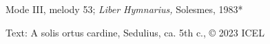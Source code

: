 

\begin{hymnsource}
Mode III, melody 53; \emph{Liber Hymnarius,} Solesmes, 1983*

Text: {A solis ortus cardine,} Sedulius, ca. 5th c., © 2023 ICEL
\end{hymnsource}
